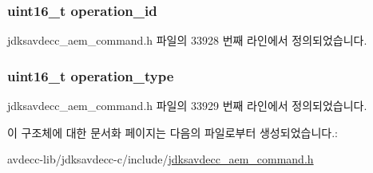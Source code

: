 \subsubsection[{\texorpdfstring{operation\+\_\+id}{operation_id}}]{\setlength{\rightskip}{0pt plus 5cm}uint16\+\_\+t operation\+\_\+id}\hypertarget{structjdksavdecc__aem__command__start__operation__response_a5b1b19c38a3b340cfc6ebcb9eeb153e2}{}\label{structjdksavdecc__aem__command__start__operation__response_a5b1b19c38a3b340cfc6ebcb9eeb153e2}


jdksavdecc\+\_\+aem\+\_\+command.\+h 파일의 33928 번째 라인에서 정의되었습니다.

\subsubsection[{\texorpdfstring{operation\+\_\+type}{operation_type}}]{\setlength{\rightskip}{0pt plus 5cm}uint16\+\_\+t operation\+\_\+type}\hypertarget{structjdksavdecc__aem__command__start__operation__response_ab2dfcd06646c4907feb4ec8153ba7b79}{}\label{structjdksavdecc__aem__command__start__operation__response_ab2dfcd06646c4907feb4ec8153ba7b79}


jdksavdecc\+\_\+aem\+\_\+command.\+h 파일의 33929 번째 라인에서 정의되었습니다.



이 구조체에 대한 문서화 페이지는 다음의 파일로부터 생성되었습니다.\+:\begin{DoxyCompactItemize}
\item 
avdecc-\/lib/jdksavdecc-\/c/include/\hyperlink{jdksavdecc__aem__command_8h}{jdksavdecc\+\_\+aem\+\_\+command.\+h}\end{DoxyCompactItemize}
